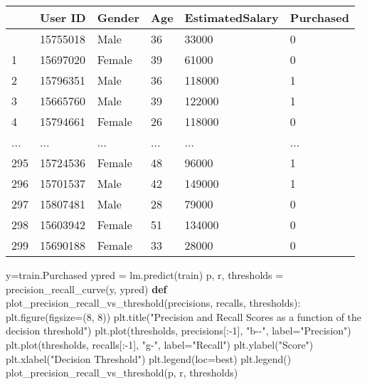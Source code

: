 \documentclass[
  letterpaper,
  DIV=11,
  numbers=noendperiod]{scrreprt}
\newenvironment{Shaded}{\begin{snugshade}}{\end{snugshade}}
\newcommand{\DecValTok}[1]{\textcolor[rgb]{0.68,0.00,0.00}{#1}}
\newcommand{\KeywordTok}[1]{\textcolor[rgb]{0.00,0.23,0.31}{\textbf{#1}}}
\newcommand{\NormalTok}[1]{\textcolor[rgb]{0.00,0.23,0.31}{#1}}
\newcommand{\OperatorTok}[1]{\textcolor[rgb]{0.37,0.37,0.37}{#1}}
\newcommand{\StringTok}[1]{\textcolor[rgb]{0.13,0.47,0.30}{#1}}
\begin{document}
\begin{longtable}[]{@{}llllll@{}}
\toprule\noalign{}
& User ID & Gender & Age & EstimatedSalary & Purchased \\
\midrule\noalign{}
\endhead
\bottomrule\noalign{}
\endlastfoot
0 & 15755018 & Male & 36 & 33000 & 0 \\
1 & 15697020 & Female & 39 & 61000 & 0 \\
2 & 15796351 & Male & 36 & 118000 & 1 \\
3 & 15665760 & Male & 39 & 122000 & 1 \\
4 & 15794661 & Female & 26 & 118000 & 0 \\
... & ... & ... & ... & ... & ... \\
295 & 15724536 & Female & 48 & 96000 & 1 \\
296 & 15701537 & Male & 42 & 149000 & 1 \\
297 & 15807481 & Male & 28 & 79000 & 0 \\
298 & 15603942 & Female & 51 & 134000 & 0 \\
299 & 15690188 & Female & 33 & 28000 & 0 \\
\end{longtable}

\begin{Shaded}
\begin{Highlighting}[]
\NormalTok{y}\OperatorTok{=}\NormalTok{train.Purchased}
\NormalTok{ypred }\OperatorTok{=}\NormalTok{ lm.predict(train)}
\NormalTok{p, r, thresholds }\OperatorTok{=}\NormalTok{ precision\_recall\_curve(y, ypred)}
\KeywordTok{def}\NormalTok{ plot\_precision\_recall\_vs\_threshold(precisions, recalls, thresholds):}
\NormalTok{    plt.figure(figsize}\OperatorTok{=}\NormalTok{(}\DecValTok{8}\NormalTok{, }\DecValTok{8}\NormalTok{))}
\NormalTok{    plt.title(}\StringTok{"Precision and Recall Scores as a function of the decision threshold"}\NormalTok{)}
\NormalTok{    plt.plot(thresholds, precisions[:}\OperatorTok{{-}}\DecValTok{1}\NormalTok{], }\StringTok{"b{-}{-}"}\NormalTok{, label}\OperatorTok{=}\StringTok{"Precision"}\NormalTok{)}
\NormalTok{    plt.plot(thresholds, recalls[:}\OperatorTok{{-}}\DecValTok{1}\NormalTok{], }\StringTok{"g{-}"}\NormalTok{, label}\OperatorTok{=}\StringTok{"Recall"}\NormalTok{)}
\NormalTok{    plt.ylabel(}\StringTok{"Score"}\NormalTok{)}
\NormalTok{    plt.xlabel(}\StringTok{"Decision Threshold"}\NormalTok{)}
\NormalTok{    plt.legend(loc}\OperatorTok{=}\StringTok{\textquotesingle{}best\textquotesingle{}}\NormalTok{)}
\NormalTok{    plt.legend()}
\NormalTok{plot\_precision\_recall\_vs\_threshold(p, r, thresholds)}
\end{Highlighting}
\end{Shaded}
\end{document}

